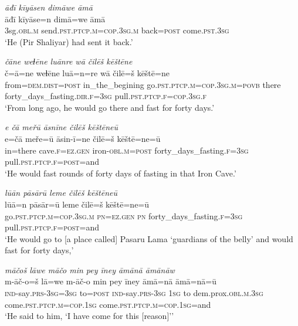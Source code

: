 \ea \label{ŽP.115}
\textit{āđī kīyāsen dimāwe āmā} \\ 
\gll āđī kīyāse=n dimā=we āmā \\ 
 3sg\textsc{.obl}\textsc{.m} send\textsc{.pst}\textsc{.ptcp}\textsc{.m}\textsc{=cop}\textsc{.3sg}\textsc{.m} back\textsc{=\textsc{post}} come\textsc{.pst}\textsc{.3sg} \\ 
\glt `He (Pir Shaliyar) had sent it back.'
\z 
 
\ea \label{ŽP.119}
\textit{čāne weɫēne luānre wā čilēš kēštēne} \\ 
\gll č=ā=ne weɫēne luā=n=re wā čilē=š kēštē=ne \\ 
 from=\textsc{dem.dist}\textsc{=\textsc{post}} in\_the\_begining go\textsc{.pst}\textsc{.ptcp}\textsc{.m}\textsc{=cop}\textsc{.3sg}\textsc{.m}\textsc{=\textsc{povb}} there forty\_days\_fasting\textsc{.dir}\textsc{.f}\textsc{=3sg} pull\textsc{.pst}\textsc{.ptcp}\textsc{.f}\textsc{=cop}\textsc{.3sg}\textsc{.f} \\ 
\glt `From long ago, he would go there and fast for forty days.'
\z 
 
\ea \label{ŽP.121}
\textit{e čā meřū āsnīne čilēš kēštēneū} \\ 
\gll e=čā meře=ū āsin-ī=ne čilē=š kēštē=ne=ū \\ 
 in=there cave\textsc{.f}\textsc{\textsc{=ez.gen}} iron\textsc{-obl}\textsc{.m}\textsc{=\textsc{post}} forty\_days\_fasting\textsc{.f}\textsc{=3sg} pull\textsc{.pst}\textsc{.ptcp}\textsc{.f}\textsc{=\textsc{post}}=and \\ 
\glt `He would fast rounds of forty days of fasting in that Iron Cave.'
\z 
 
\ea \label{ŽP.122}
\textit{lūān pāsārū leme čilēš kēštēneū} \\ 
\gll lūā=n pāsār=ū leme čilē=š kēštē=ne=ū \\ 
 go\textsc{.pst}\textsc{.ptcp}\textsc{.m}\textsc{=cop}\textsc{.3sg}\textsc{.m} \textsc{pn}\textsc{\textsc{=ez.gen}} \textsc{pn} forty\_days\_fasting\textsc{.f}\textsc{=3sg} pull\textsc{.pst}\textsc{.ptcp}\textsc{.f}\textsc{=\textsc{post}}=and \\ 
\glt `He would go to [a place called] Pasaru Lama ‘guardians of the belly’ and would fast for forty days,'
\z 
 
\ea \label{ŽP.138}
\textit{māčoš lāwe māčo min pey īney āmānā āmānāw} \\ 
\gll m-āč-o=š lā=we m-āč-o min pey īney āmā=nā āmā=nā=ū \\ 
 \textsc{ind-}say\textsc{.prs}\textsc{-3sg}\textsc{=3sg} to\textsc{=\textsc{post}} \textsc{ind-}say\textsc{.prs}\textsc{-3sg} \textsc{1sg} to dem.prox\textsc{.obl}\textsc{.m}\textsc{.3sg} come\textsc{.pst}\textsc{.ptcp}\textsc{.m}\textsc{=cop}\textsc{.\textsc{1sg}} come\textsc{.pst}\textsc{.ptcp}\textsc{.m}\textsc{=cop}\textsc{.\textsc{1sg}}=and \\ 
\glt `He said to him, ‘I have come for this [reason]’'
\z 
 
